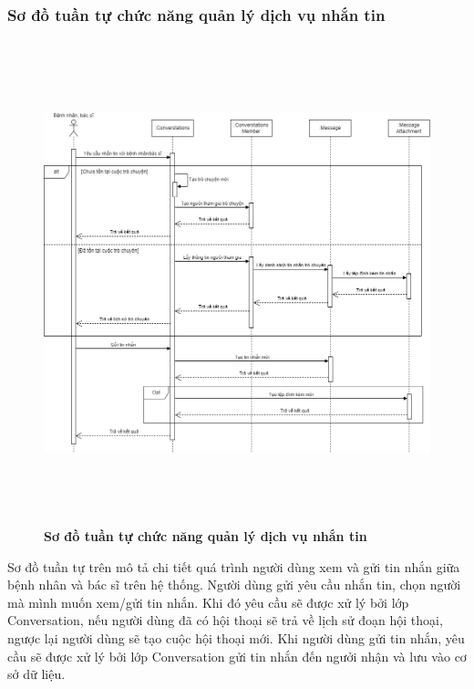 \subsubsection{Sơ đồ tuần tự chức năng quản lý dịch vụ nhắn tin}
\begin{figure}[H]
  \centering
  \includegraphics[width=15.5cm,height=14cm]{Images/sequence/sequence_chat.png}
  \caption[Sơ đồ tuần tự chức năng quản lý dịch vụ nhắn tin]{\bfseries \fontsize{12pt}{0pt}
  \selectfont Sơ đồ tuần tự chức năng quản lý dịch vụ nhắn tin}
  \label{sequence_chat} %
\end{figure}
Sơ đồ tuần tự trên mô tả chi tiết quá trình người dùng xem và gửi tin nhắn giữa bệnh nhân và bác sĩ trên hệ thống. Người dùng gửi yêu cầu nhắn tin, 
chọn người mà mình muốn xem/gửi tin nhắn. Khi đó yêu cầu sẽ được xử lý bởi lớp Conversation, nếu người dùng đã có hội thoại sẽ trả về lịch sử đoạn hội thoại, ngược lại người dùng sẽ tạo cuộc hội thoại mới. 
Khi người dùng gửi tin nhắn, yêu cầu sẽ được xử lý bởi lớp Conversation gửi tin nhắn đến ngưởi nhận và lưu vào cơ sở dữ liệu.

